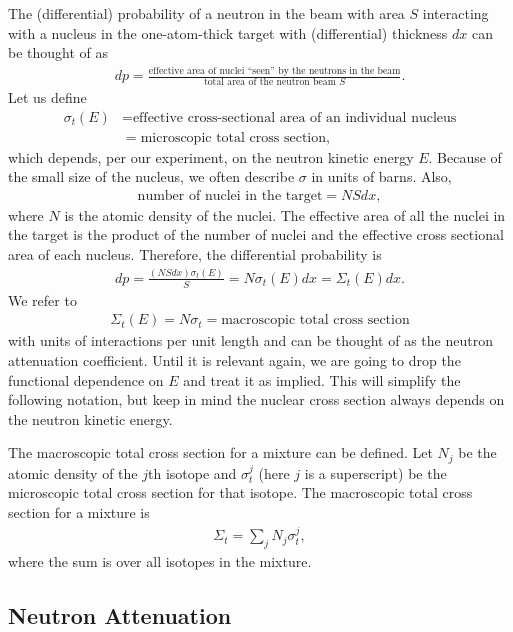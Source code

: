 The (differential) probability of a neutron in the beam with area $S$ interacting with a nucleus in the one-atom-thick target with (differential) thickness $dx$ can be thought of as
\begin{align}
  dp = \frac{\text{effective area of nuclei ``seen'' by the neutrons in the beam}}{\text{total area of the neutron beam $S$}}. \nonumber
\end{align}
Let us define
\begin{align}
  \sigma_t(E)
  &= \text{effective cross-sectional area of an individual nucleus} \nonumber \\
  &= \text{microscopic total cross section}, \nonumber
\end{align}
which depends, per our experiment, on the neutron kinetic energy $E$. Because of the small size of the nucleus, we often describe $\sigma$ in units of barns. Also,
\begin{align}
  \text{number of nuclei in the target} = N S dx,
\end{align}
where $N$ is the atomic density of the nuclei. The effective area of all the nuclei in the target is the product of the number of nuclei and the effective cross sectional area of each nucleus. Therefore, the differential probability is
\begin{align}
  dp = \frac{ ( N S dx ) \sigma_t(E) }{ S } = N \sigma_t(E) dx = \Sigma_t(E) dx.
\end{align}
We refer to
\begin{align}
  \Sigma_t(E) = N \sigma_t = \text{macroscopic total cross section} \nonumber
\end{align}
with units of interactions per unit length and can be thought of as the neutron attenuation coefficient. Until it is relevant again, we are going to drop the functional dependence on $E$ and treat it as implied. This will simplify the following notation, but keep in mind the nuclear cross section always depends on the neutron kinetic energy.

The macroscopic total cross section for a mixture can be defined. Let $N_j$ be the atomic density of the $j$th isotope and $\sigma_t^j$ (here $j$ is a superscript) be the microscopic total cross section for that isotope. The macroscopic total cross section for a mixture is
\begin{align}
  \Sigma_t = \sum_j N_j \sigma_t^j ,
\end{align}
where the sum is over all isotopes in the mixture.

\subsection{Neutron Attenuation}

